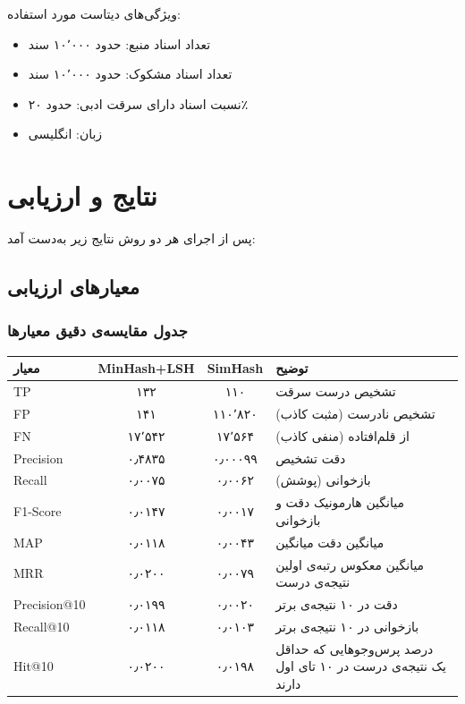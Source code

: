\documentclass[12pt,a4paper]{article}
\begin{document}
ویژگی‌های دیتاست مورد استفاده:

\begin{itemize}
    \item تعداد اسناد منبع: حدود ۱۰٬۰۰۰ سند
    \item تعداد اسناد مشکوک: حدود ۱۰٬۰۰۰ سند
    \item نسبت اسناد دارای سرقت ادبی: حدود ۲۰٪
    \item زبان: انگلیسی
\end{itemize}

\section{نتایج و ارزیابی}

پس از اجرای هر دو روش نتایج زیر به‌دست آمد:

\subsection{معیارهای ارزیابی}

\subsubsection*{جدول مقایسه‌ی دقیق معیارها}

\begin{center}
\begin{tabular}{|l|c|c|p{6cm}|}
\hline
\textbf{معیار} & \textbf{MinHash+LSH} & \textbf{SimHash} & \textbf{توضیح} \\
\hline
TP & ۱۳۲ & ۱۱۰ & تشخیص درست سرقت \\
\hline
FP & ۱۴۱ & ۱۱۰٬۸۲۰ & تشخیص نادرست (مثبت کاذب) \\
\hline
FN & ۱۷٬۵۴۲ & ۱۷٬۵۶۴ & از قلم‌افتاده (منفی کاذب) \\
\hline
Precision & ۰٫۴۸۳۵ & ۰٫۰۰۰۹۹ & دقت تشخیص \\
\hline
Recall & ۰٫۰۰۷۵ & ۰٫۰۰۶۲ & بازخوانی (پوشش) \\
\hline
F1-Score & ۰٫۰۱۴۷ & ۰٫۰۰۱۷ & میانگین هارمونیک دقت و بازخوانی \\
\hline
MAP & ۰٫۰۱۱۸ & ۰٫۰۰۴۳ & میانگین دقت میانگین \\
\hline
MRR & ۰٫۰۲۰۰ & ۰٫۰۰۷۹ & میانگین معکوس رتبه‌ی اولین نتیجه‌ی درست \\
\hline
Precision@10 & ۰٫۰۱۹۹ & ۰٫۰۰۲۰ & دقت در ۱۰ نتیجه‌ی برتر \\
\hline
Recall@10 & ۰٫۰۱۱۸ & ۰٫۰۱۰۳ & بازخوانی در ۱۰ نتیجه‌ی برتر \\
\hline
Hit@10 & ۰٫۰۲۰۰ & ۰٫۰۱۹۸ & درصد پرس‌وجوهایی که حداقل یک نتیجه‌ی درست در ۱۰ تای اول دارند \\
\hline
\end{tabular}
\end{center}
\end{document}
